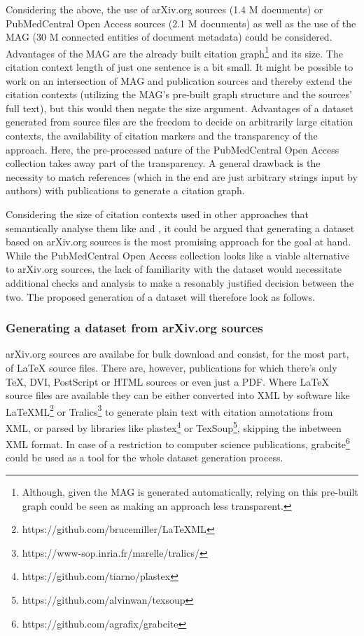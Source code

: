 \documentclass{proseminar}
\begin{document}
Considering the above, the use of arXiv.org sources (1.4 M documents) or PubMedCentral Open Access sources (2.1 M documents) as well as the use of the MAG (30 M connected entities of document metadata) could be considered. Advantages of the MAG are the already built citation graph\footnote{Although, given the MAG is generated automatically, relying on this pre-built graph could be seen as making an approach less transparent.} and its size. The citation context length of just one sentence is a bit small. It might be possible to work on an intersection of MAG and publication sources and thereby extend the citation contexts (utilizing the MAG's pre-built graph structure and the sources' full text), but this would then negate the size argument. Advantages of a dataset generated from source files are the freedom to decide on arbitrarily large citation contexts, the availability of citation markers and the transparency of the approach. Here, the pre-processed nature of the PubMedCentral Open Access collection takes away part of the transparency. A general drawback is the necessity to match references (which in the end are just arbitrary strings input by authors) with publications to generate a citation graph.

Considering the size of citation contexts used in other approaches that semantically analyse them like \cite{Duma2016} and \cite{Kobayashi2018}, it could be argued that generating a dataset based on arXiv.org sources is the most promising approach for the goal at hand. While the PubMedCentral Open Access collection looks like a viable alternative to arXiv.org sources, the lack of familiarity with the dataset would necessitate additional checks and analysis to make a resonably justified decision between the two. The proposed generation of a dataset will therefore look as follows.

\subsubsection{Generating a dataset from arXiv.org sources}
arXiv.org sources are availabe for bulk download and consist, for the most part, of LaTeX source files. There are, however, publications for which there's only TeX, DVI, PostScript or HTML sources or even just a PDF. Where LaTeX source files are available they can be either converted into XML by software like LaTeXML\footnote{https://github.com/brucemiller/LaTeXML} or Tralics\footnote{https://www-sop.inria.fr/marelle/tralics/} to generate plain text with citation annotations from XML, or parsed by libraries like plastex\footnote{https://github.com/tiarno/plastex} or TexSoup\footnote{https://github.com/alvinwan/texsoup}, skipping the inbetween XML format. In case of a restriction to computer science publications, grabcite\footnote{https://github.com/agrafix/grabcite} could be used as a tool for the whole dataset generation process.
\end{document}

